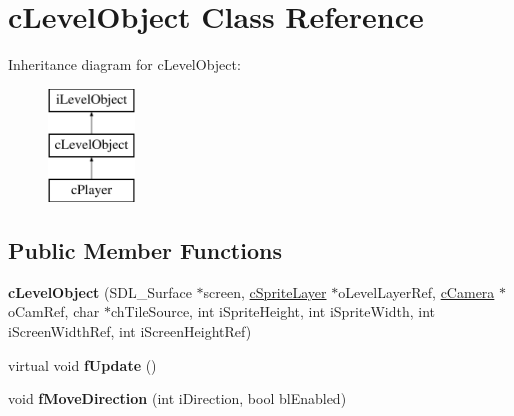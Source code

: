 \hypertarget{classc_level_object}{\section{c\-Level\-Object Class Reference}
\label{classc_level_object}
}
Inheritance diagram for c\-Level\-Object\-:\begin{figure}[H]
\begin{center}
\leavevmode
\includegraphics[height=3.000000cm]{classc_level_object}
\end{center}
\end{figure}
\subsection*{Public Member Functions}
\begin{DoxyCompactItemize}
\item 
\hypertarget{classc_level_object_a3caa9a85867d35c700ce8146e2ff2975}{{\bfseries c\-Level\-Object} (S\-D\-L\-\_\-\-Surface $\ast$screen, \hyperlink{classc_sprite_layer}{c\-Sprite\-Layer} $\ast$o\-Level\-Layer\-Ref, \hyperlink{classc_camera}{c\-Camera} $\ast$o\-Cam\-Ref, char $\ast$ch\-Tile\-Source, int i\-Sprite\-Height, int i\-Sprite\-Width, int i\-Screen\-Width\-Ref, int i\-Screen\-Height\-Ref)}\label{classc_level_object_a3caa9a85867d35c700ce8146e2ff2975}

\item 
\hypertarget{classc_level_object_ade464b941da84f307ca13e7b7ff20ff9}{virtual void {\bfseries f\-Update} ()}\label{classc_level_object_ade464b941da84f307ca13e7b7ff20ff9}

\item 
\hypertarget{classc_level_object_ab1c03ffbaef6a3b662c737758160f0d7}{void {\bfseries f\-Move\-Direction} (int i\-Direction, bool bl\-Enabled)}\label{classc_level_object_ab1c03ffbaef6a3b662c737758160f0d7}

\end{DoxyCompactItemize}
